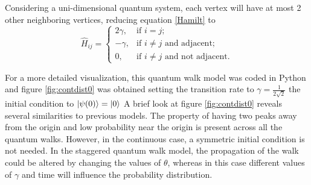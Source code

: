 \documentclass[../../dissertation.tex]{subfiles}
\begin{document}
Considering a uni-dimensional quantum system, each vertex will have at most 2
other neighboring vertices, reducing equation \eqref{Hamilt} to
\begin{equation}
	\hat{H}_{ij} = \begin{cases} 
		2\gamma, & \mbox{if } i= j; \\ 
		-\gamma, & \mbox{if } i\neq j\mbox{ and adjacent};\\
		0, & \mbox{if } i\neq j\mbox{ and not adjacent}.
	\end{cases}
\end{equation}\par

For a more detailed visualization, this quantum walk model was coded in Python
and figure \ref{fig:contdist0} was obtained setting the transition rate to
$\gamma=\frac{1}{2\sqrt{2}}$ the initial condition to $\ket{\psi(0)} = \ket{0}$ 
A brief look at figure \ref{fig:contdist0} reveals several similarities to
previous models. The property of having two peaks away from the origin and low
probability near the origin is present across all the quantum walks. However, in
the continuous case, a symmetric initial condition is not needed. In the
staggered quantum walk model, the propagation of the walk could be altered by
changing the values of $\theta$, whereas in this case different values of
$\gamma$ and time will influence the probability distribution.\par
\end{document}
